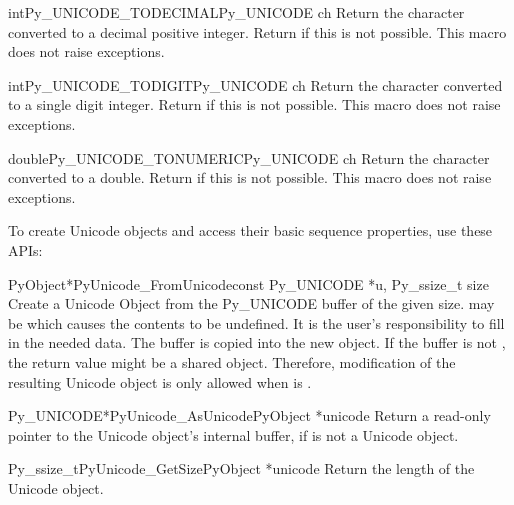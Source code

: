 \begin{cfuncdesc}{int}{Py_UNICODE_TODECIMAL}{Py_UNICODE ch}
  Return the character  converted to a decimal positive
  integer.  Return  if this is not possible.  This macro
  does not raise exceptions.
\end{cfuncdesc}

\begin{cfuncdesc}{int}{Py_UNICODE_TODIGIT}{Py_UNICODE ch}
  Return the character  converted to a single digit integer.
  Return  if this is not possible.  This macro does not raise
  exceptions.
\end{cfuncdesc}

\begin{cfuncdesc}{double}{Py_UNICODE_TONUMERIC}{Py_UNICODE ch}
  Return the character  converted to a double.
  Return  if this is not possible.  This macro does not raise
  exceptions.
\end{cfuncdesc}


To create Unicode objects and access their basic sequence properties,
use these APIs:

\begin{cfuncdesc}{PyObject*}{PyUnicode_FromUnicode}{const Py_UNICODE *u,
                                                    Py_ssize_t size}
  Create a Unicode Object from the Py_UNICODE buffer  of the
  given size.  may be \NULL{} which causes the contents to be
  undefined. It is the user's responsibility to fill in the needed
  data.  The buffer is copied into the new object. If the buffer is
  not \NULL{}, the return value might be a shared object. Therefore,
  modification of the resulting Unicode object is only allowed when
   is \NULL{}.
\end{cfuncdesc}

\begin{cfuncdesc}{Py_UNICODE*}{PyUnicode_AsUnicode}{PyObject *unicode}
  Return a read-only pointer to the Unicode object's internal
   buffer, \NULL{} if  is not a Unicode
  object.
\end{cfuncdesc}

\begin{cfuncdesc}{Py_ssize_t}{PyUnicode_GetSize}{PyObject *unicode}
  Return the length of the Unicode object.
\end{cfuncdesc}

